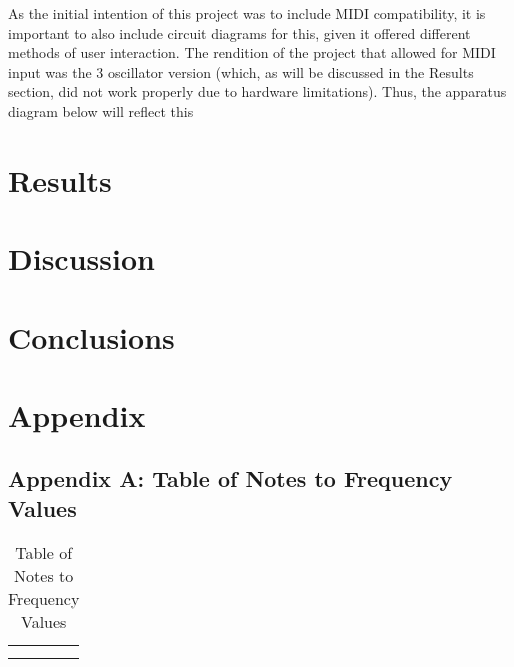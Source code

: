 \documentclass[10pt]{article}
\begin{document}
As the initial intention of this project was to include MIDI compatibility, it is important to also include circuit diagrams for this, given it offered different methods of user interaction. The rendition of the project that allowed for MIDI input was the 3 oscillator version (which, as will be discussed in the Results section, did not work properly due to hardware limitations). Thus, the apparatus diagram below will reflect this 


\section{Results}





\section{Discussion}




\section{Conclusions}




\section{Appendix}

\subsection{Appendix A: Table of Notes to Frequency Values}

\begin{table}[h]
    \centering
    \begin{tabular}{c|c}
         &  \\
         & 
    \end{tabular}
    \caption{Table of Notes to Frequency Values}
    \label{tab:pianonotestofrequency}
\end{table}
\end{document}
